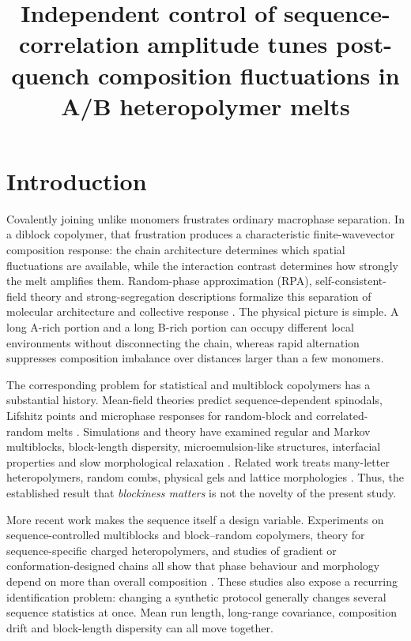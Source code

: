 \documentclass[pdflatex,sn-nature,onecolumn]{sn-jnl}
\title[Independent control of sequence-correlation amplitude]{Independent control of sequence-correlation amplitude tunes post-quench composition fluctuations in A/B heteropolymer melts}
\author*{\fnm{Alexander Okezue} \sur{Bell}}\email{okezue@stanford.edu}
\affil{\orgname{Stanford University}, \orgaddress{\street{450 Jane Stanford Way}, \city{Stanford}, \state{CA}, \postcode{94305}, \country{USA}}}
\begin{document}
\maketitle
\raggedright
\raggedbottom
\pagestyle{plain}
\thispagestyle{plain}
\linenumbers
\renewcommand\linenumberfont{\normalfont\tiny\sffamily\color{gray}}

\section{Introduction}

Covalently joining unlike monomers frustrates ordinary macrophase separation. In a diblock copolymer, that frustration produces a characteristic finite-wavevector composition response: the chain architecture determines which spatial fluctuations are available, while the interaction contrast determines how strongly the melt amplifies them. Random-phase approximation (RPA), self-consistent-field theory and strong-segregation descriptions formalize this separation of molecular architecture and collective response \cite{Leibler1980,FredricksonHelfand1987,MatsenBates1996,BatesFredrickson1999}. The physical picture is simple. A long A-rich portion and a long B-rich portion can occupy different local environments without disconnecting the chain, whereas rapid alternation suppresses composition imbalance over distances larger than a few monomers.

The corresponding problem for statistical and multiblock copolymers has a substantial history. Mean-field theories predict sequence-dependent spinodals, Lifshitz points and microphase responses for random-block and correlated-random melts \cite{FredricksonMilnerLeibler1992,Angerman1996,MaoSpakowitz2016,Patyukova2021}. Simulations and theory have examined regular and Markov multiblocks, block-length dispersity, microemulsion-like structures, interfacial properties and slow morphological relaxation \cite{Gavrilov2011CPL,Gavrilov2011PSA,Govorun2017,Rudyak2022,Steinmuller2012Morph,Steinmuller2012Bulk}. Related work treats many-letter heteropolymers, random combs, physical gels and lattice morphologies \cite{Sfatos1994,Foster1995,Glotzer1993,Dotera1999}. Thus, the established result that \emph{blockiness matters} is not the novelty of the present study.

More recent work makes the sequence itself a design variable. Experiments on sequence-controlled multiblocks and block--random copolymers, theory for sequence-specific charged heteropolymers, and studies of gradient or conformation-designed chains all show that phase behaviour and morphology depend on more than overall composition \cite{Zhang2017,Taylor2024,LiMuthukumar2022,Ganesan2012,Govorun2015,Govorun2021}. These studies also expose a recurring identification problem: changing a synthetic protocol generally changes several sequence statistics at once. Mean run length, long-range covariance, composition drift and block-length dispersity can all move together.
\end{document}
